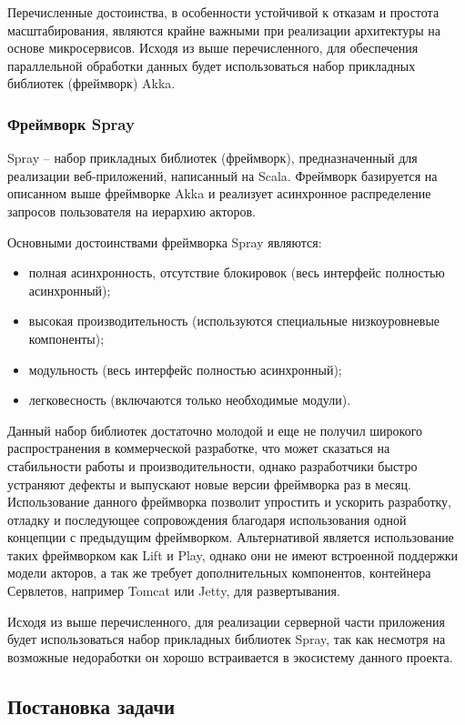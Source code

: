 Перечисленные достоинства, в особенности устойчивой к отказам и простота масштабирования, являются крайне важными при реализации архитектуры на основе микросервисов. Исходя из выше перечисленного, для обеспечения параллельной обработки данных будет использоваться набор прикладных библиотек (фреймворк) Akka. 

\subsubsection{Фреймворк Spray}
\label{sec:techs:spray}

Spray – набор прикладных библиотек (фреймворк), предназначенный для реализации веб-приложений, написанный на Scala. Фреймворк базируется на описанном выше фреймворке Akka и реализует асинхронное распределение запросов пользователя на иерархию акторов. 

Основными достоинствами фреймворка Spray являются:
\begin{itemize}
  \item полная асинхронность, отсутствие блокировок (весь интерфейс полностью асинхронный);
  \item высокая производительность (используются специальные низкоуровневые компоненты);
  \item модульность (весь интерфейс полностью асинхронный);
  \item легковесность (включаются только необходимые модули).
\end{itemize}

Данный набор библиотек достаточно молодой и еще не получил широкого распространения в коммерческой разработке, что может сказаться на стабильности работы и производительности, однако разработчики быстро устраняют дефекты и выпускают новые версии фреймворка раз в месяц. Использование данного фреймворка позволит упростить и ускорить разработку, отладку и последующее сопровождения благодаря использования одной концепции с предыдущим фреймворком.
Альтернативой является использование таких фреймворком как Lift и Play, однако они не имеют встроенной поддержки модели акторов, а так же требует дополнительных компонентов, контейнера Сервлетов, например Tomcat или Jetty, для развертывания.

Исходя из выше перечисленного, для реализации серверной части приложения будет использоваться набор прикладных библиотек Spray, так как несмотря на возможные недоработки он хорошо встраивается в экосистему данного проекта.
\subsection{Постановка задачи}
\label{sec:domain:requirements}

